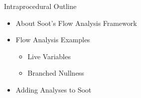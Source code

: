 


\begin{slide}{Intraprocedural Outline}
\begin{itemize}
\item About Soot's Flow Analysis Framework
\item Flow Analysis Examples
\begin{itemize} 
\item Live Variables
\item Branched Nullness
\end{itemize}
\item Adding Analyses to Soot
\end{itemize}
\end{slide}


